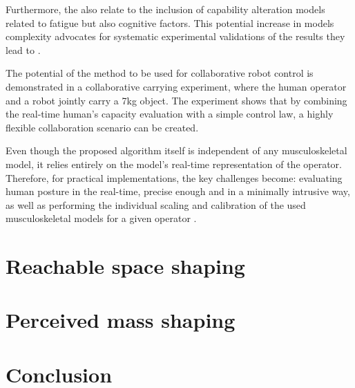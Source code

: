 Furthermore, the  also relate to the inclusion of capability alteration models related to fatigue but also cognitive factors. This potential increase in models complexity advocates for systematic experimental validations of the results they lead to \cite{biomechanics1010008}.

The potential of the method to be used for collaborative robot control is demonstrated in a collaborative carrying experiment, where the human operator and a robot jointly carry a 7kg object. The experiment shows that by combining the real-time human's capacity evaluation with a simple control law, a highly flexible collaboration scenario can be created. 

Even though the proposed algorithm itself is independent of any musculoskeletal model, it relies entirely on the model's real-time representation of the operator. Therefore, for practical implementations, the key challenges become: evaluating human posture in the real-time, precise enough and in a minimally intrusive way, as well as performing the individual scaling and calibration of the used musculoskeletal models for a given operator \cite{correa20112782}.

\section{Reachable space shaping}
\label{ch:human_robot_reachable_space}


\section{Perceived mass shaping}
\label{ch:human_robot_percieved_mass}


\section{Conclusion}

